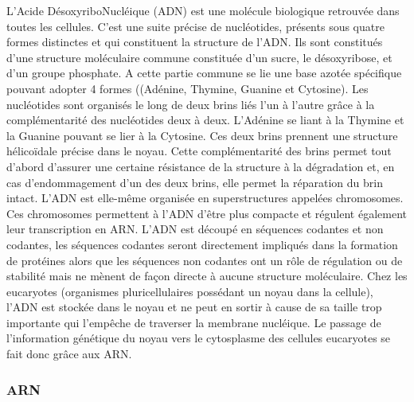 L'Acide DésoxyriboNucléique (ADN) est une molécule biologique retrouvée dans toutes les cellules. C'est une suite précise de nucléotides, présents sous quatre formes distinctes et qui constituent la structure de l'ADN. Ils sont constitués d'une structure moléculaire commune constituée d'un sucre, le désoxyribose, et d'un groupe phosphate. A cette partie commune se lie une base azotée spécifique pouvant adopter 4 formes ((Adénine, Thymine, Guanine et Cytosine). Les nucléotides sont organisés le long de deux brins liés l'un à l'autre grâce à la complémentarité des nucléotides deux à deux. L'Adénine se liant à la Thymine et la Guanine pouvant se lier à la Cytosine. Ces deux brins prennent une structure hélicoïdale précise dans le noyau. Cette complémentarité des brins permet tout d'abord d'assurer une certaine résistance de la structure à la dégradation et, en cas d'endommagement d'un des deux brins, elle permet la réparation du brin intact. L'ADN est elle-même organisée en superstructures appelées chromosomes. Ces chromosomes permettent à l'ADN d'être plus compacte et régulent également leur transcription en ARN.
L'ADN est découpé en séquences codantes et non codantes, les séquences codantes seront directement impliqués dans la formation de protéines alors que les séquences non codantes ont un rôle de régulation ou de stabilité mais ne mènent de façon directe à aucune structure moléculaire.
Chez les eucaryotes (organismes pluricellulaires possédant un noyau dans la cellule), l'ADN est stockée dans le noyau et ne peut en sortir à cause de sa taille trop importante qui l'empêche de traverser la membrane nucléique. Le passage de l'information génétique du noyau vers le cytosplasme des cellules eucaryotes se fait donc grâce aux ARN.

\subsubsection{ARN}

